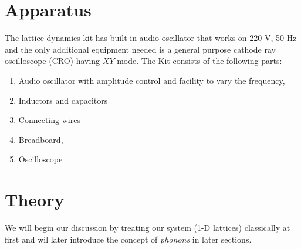 \documentclass[%
 aip,
 amsmath,amssymb,
 reprint, floatfix%
]{revtex4-1}
\begin{document}
\section{Apparatus}
    The lattice dynamics kit has built-in audio oscillator that works on 220 V, 50 Hz and the only additional equipment needed is a general purpose cathode ray oscilloscope (CRO) having $XY$ mode. The Kit consists of the following parts:
    \begin{enumerate}
        \item Audio oscillator with amplitude control and facility to vary the frequency,
        \item Inductors and capacitors
        \item Connecting wires
        \item Breadboard,
        \item Oscilloscope
    \end{enumerate}


\section{Theory}
    We will begin our discussion by treating our system (1-D lattices) classically at first and wil later introduce the concept of \textit{phonons} in later sections. 
\end{document}
